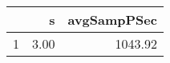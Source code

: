 \begin{table}[h]
\centering
\begin{tabular}{rrr}
  \hline
 & s & avgSampPSec \\ 
  \hline
1 & 3.00 & 1043.92 \\ 
   \hline
\end{tabular}
\end{table}
